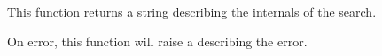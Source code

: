 This function returns a string describing the internals of the search.

On error, this function will raise a  describing
the error.
